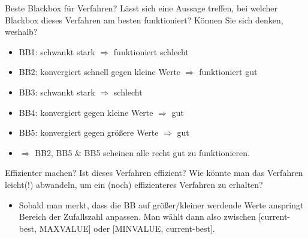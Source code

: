 \documentclass{ocbeameruni}
\begin{document}
\begin{frame}{Beste Blackbox für Verfahren?}
Lässt sich eine Aussage treffen, bei welcher Blackbox dieses Verfahren am besten funktioniert?
Können Sie sich denken, weshalb?
    \begin{itemize}
    \item BB1: schwankt stark $\Rightarrow$ funktioniert schlecht
    \item BB2: konvergiert schnell gegen kleine Werte $\Rightarrow$ funktioniert gut
    \item BB3: schwankt stark $\Rightarrow$ schlecht
    \item BB4: konvergiert gegen kleine Werte $\Rightarrow$ gut
    \item BB5: konvergiert gegen größere Werte $\Rightarrow$ gut
    \item $\Rightarrow$ BB2, BB5 & BB5 scheinen alle recht gut zu funktionieren.
    \end{itemize}
\end{frame}


\begin{frame}{Effizienter machen?}
Ist dieses Verfahren effizient? Wie könnte man das Verfahren leicht(!) abwandeln, um ein (noch)
effizienteres Verfahren zu erhalten?
    \begin{itemize}
    \item Sobald man merkt, dass die BB auf größer/kleiner werdende Werte anspringt Bereich der Zufallszahl anpassen. Man wählt dann also zwischen [current-best, MAXVALUE] oder [MINVALUE, current-best]. 
    \end{itemize}
\end{frame}
\end{document}
